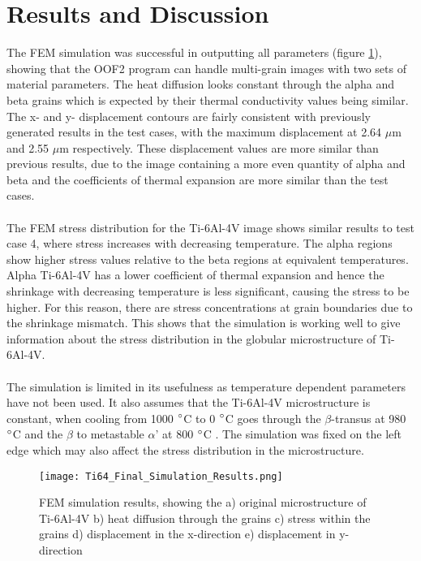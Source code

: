 \documentclass[report.tex]{subfiles}
\begin{document}
\section{Results and Discussion}

The FEM simulation was successful in outputting all parameters (figure \ref{fig:FinalSimulationResults}), showing that the OOF2 program can handle multi-grain images with two sets of material parameters. The heat diffusion looks constant through the alpha and beta grains which is expected by their thermal conductivity values being similar. The x- and y- displacement contours are fairly consistent with previously generated results in the test cases, with the maximum displacement at 2.64 $\mu$m and 2.55 $\mu$m respectively. These displacement values are more similar than previous results, due to the image containing a more even quantity of alpha and beta and the coefficients of thermal expansion are more similar than the test cases.\\
\\ 
The FEM stress distribution for the Ti-6Al-4V image shows similar results to test case 4, where stress increases with decreasing temperature. The alpha regions show higher stress values relative to the beta regions at equivalent temperatures. Alpha Ti-6Al-4V has a lower coefficient of thermal expansion and hence the shrinkage with decreasing temperature is less significant, causing the stress to be higher. For this reason, there are stress concentrations at grain boundaries due to the shrinkage mismatch. This shows that the simulation is working well to give information about the stress distribution in the globular microstructure of Ti-6Al-4V.\\
\\
The simulation is limited in its usefulness as temperature dependent parameters have not been used. It also assumes that the Ti-6Al-4V microstructure is constant, when cooling from 1000 $\degree$C to 0 $\degree$C goes through the $\beta$-transus at 980 $\degree$C and the $\beta$ to metastable $\alpha$' at 800 $\degree$C \cite{Ti64PhaseDiagram}. The simulation was fixed on the left edge which may also affect the stress distribution in the microstructure.

\begin{figure}[h!]
    \centering
    \texttt{[image: Ti64\_Final\_Simulation\_Results.png]}
    \caption{FEM simulation results, showing the a) original microstructure of Ti-6Al-4V b) heat diffusion through the grains c) stress    within the grains d) displacement in the x-direction e) displacement in y-direction}
    \label{fig:FinalSimulationResults}
\end{figure}
\end{document}
